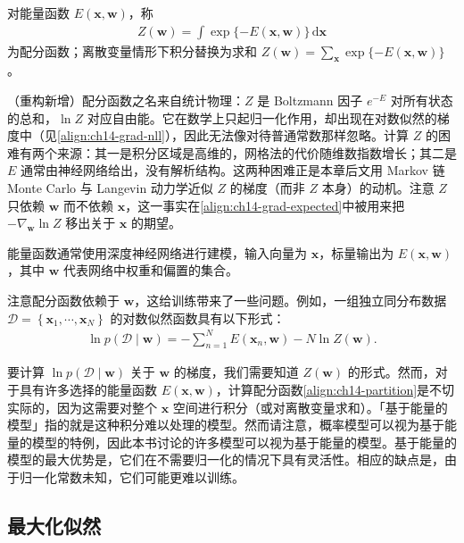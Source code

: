 \documentclass[../../main.tex]{subfiles}
\begin{document}
\begin{definition}[配分函数]\label{definition:ch14-配分函数}
对能量函数 $E(\bm{x},\bm{w})$，称
\begin{align*}
Z(\bm{w})=\int\exp\{-E(\bm{x},\bm{w})\}\,\mathrm{d}\bm{x}
\end{align*}
为配分函数；离散变量情形下积分替换为求和 $Z(\bm{w})=\sum_{\bm{x}}\exp\{-E(\bm{x},\bm{w})\}$。
\end{definition}

\begin{remark}（重构新增）配分函数之名来自统计物理：$Z$ 是 Boltzmann 因子 $e^{-E}$ 对所有状态的总和，$\ln Z$ 对应自由能。它在数学上只起归一化作用，却出现在对数似然的梯度中（见\eqref{align:ch14-grad-nll}），因此无法像对待普通常数那样忽略。计算 $Z$ 的困难有两个来源：其一是积分区域是高维的，网格法的代价随维数指数增长；其二是 $E$ 通常由神经网络给出，没有解析结构。这两种困难正是本章后文用 Markov 链 Monte Carlo 与 Langevin 动力学近似 $Z$ 的梯度（而非 $Z$ 本身）的动机。注意 $Z$ 只依赖 $\bm{w}$ 而不依赖 $\bm{x}$，这一事实在\eqref{align:ch14-grad-expected}中被用来把 $-\nabla_{\bm{w}}\ln Z$ 移出关于 $\bm{x}$ 的期望。
\end{remark}

能量函数通常使用深度神经网络进行建模，输入向量为 $\bm{x}$，标量输出为 $E(\bm{x},\bm{w})$，其中 $\bm{w}$ 代表网络中权重和偏置的集合。

注意配分函数依赖于 $\bm{w}$，这给训练带来了一些问题。例如，一组独立同分布数据 $\mathcal{D}=\left\{\bm{x}_{1},\cdots,\bm{x}_{N}\right\}$ 的对数似然函数具有以下形式：
\begin{align}
\ln p(\mathcal{D}\mid\bm{w})=-\sum_{n=1}^{N}E\!\left(\bm{x}_{n},\bm{w}\right)-N\ln Z(\bm{w}).
\label{align:ch14-ebm-nll}
\end{align}

要计算 $\ln p(\mathcal{D}\mid\bm{w})$ 关于 $\bm{w}$ 的梯度，我们需要知道 $Z(\bm{w})$ 的形式。然而，对于具有许多选择的能量函数 $E(\bm{x},\bm{w})$，计算配分函数\eqref{align:ch14-partition}是不切实际的，因为这需要对整个 $\bm{x}$ 空间进行积分（或对离散变量求和）。「基于能量的模型」指的就是这种积分难以处理的模型。然而请注意，概率模型可以视为基于能量的模型的特例，因此本书讨论的许多模型可以视为基于能量的模型。基于能量的模型的最大优势是，它们在不需要归一化的情况下具有灵活性。相应的缺点是，由于归一化常数未知，它们可能更难以训练。

\subsection{最大化似然}\label{subsection:ch14-最大化似然}
\end{document}
